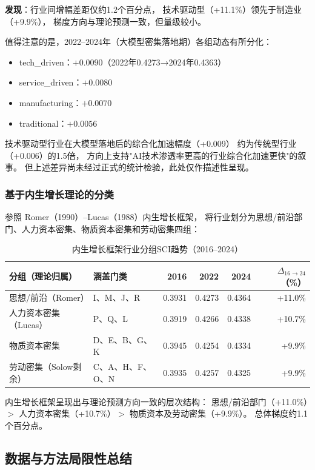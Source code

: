 \documentclass[12pt,a4paper]{ctexart}
\begin{document}
\textbf{发现}：行业间增幅差距仅约1.2个百分点，
技术驱动型（+11.1\%）领先于制造业（+9.9\%），
梯度方向与理论预测一致，但量级较小。

值得注意的是，2022--2024年（大模型密集落地期）各组动态有所分化：
\begin{itemize}
    \item tech\_driven：$+0.0090$（2022年0.4273→2024年0.4363）
    \item service\_driven：$+0.0080$
    \item manufacturing：$+0.0070$
    \item traditional：$+0.0056$
\end{itemize}
技术驱动型行业在大模型落地后的综合化加速幅度（+0.009）
约为传统型行业（+0.006）的1.5倍，
方向上支持"AI技术渗透率更高的行业综合化加速更快"的叙事。
但上述差异尚未经过正式的统计检验，此处仅作描述性呈现。

\subsubsection{基于内生增长理论的分类}

参照 Romer（1990）--Lucas（1988）内生增长框架，
将行业划分为思想/前沿部门、人力资本密集、物质资本密集和劳动密集四组：

\begin{table}[H]
\centering
\caption{内生增长框架行业分组SCI趋势（2016--2024）}
\begin{tabular}{lp{4.0cm}rrrr}
\toprule
分组（理论归属） & 涵盖门类 & 2016 & 2022 & 2024 & $\Delta_{16\to24}$（\%） \\
\midrule
思想/前沿（Romer） & I、M、J、R & 0.3931 & 0.4273 & 0.4364 & +11.0\% \\
人力资本密集（Lucas） & P、Q、L & 0.3919 & 0.4266 & 0.4338 & +10.7\% \\
物质资本密集 & D、E、B、G、K & 0.3945 & 0.4254 & 0.4334 & +9.9\% \\
劳动密集（Solow剩余） & C、A、H、F、O、N & 0.3935 & 0.4257 & 0.4325 & +9.9\% \\
\bottomrule
\end{tabular}
\end{table}

内生增长框架呈现出与理论预测方向一致的层次结构：
思想/前沿部门（+11.0\%）$>$ 人力资本密集（+10.7\%）$>$ 物质资本及劳动密集（+9.9\%）。
总体梯度约1.1个百分点。

\subsection{数据与方法局限性总结}
\end{document}
